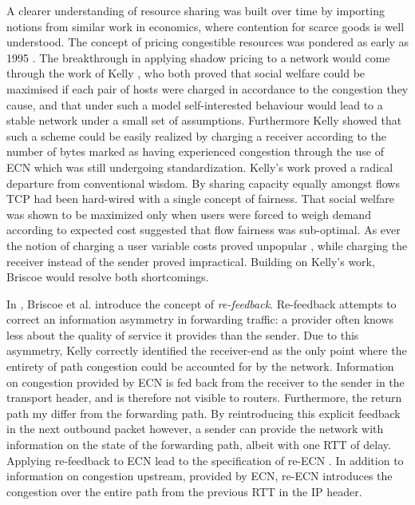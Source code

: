 A clearer understanding of resource sharing was built over time by importing notions from similar work in economics, where contention for scarce goods is well understood. 
The concept of pricing congestible resources was pondered as early as 1995 \cite{MacKieMason:1995p493}. 
The breakthrough in applying shadow pricing to a network would come through the work of Kelly \cite{Kelly:1998p139}, who both proved that social welfare could be maximised if each pair of hosts were charged in accordance to the congestion they cause, and that under such a model self-interested behaviour would lead to a stable network under a small set of assumptions.
Furthermore Kelly showed that such a scheme could be easily realized by charging a receiver according to the number of bytes marked as having experienced congestion through the use of \ac{ECN} which was still undergoing standardization.
Kelly's work proved a radical departure from conventional wisdom. 
By sharing capacity equally amongst flows \ac{TCP} had been hard-wired with a single concept of fairness.
That social welfare was shown to be maximized only when users were forced to weigh demand according to expected cost suggested that flow fairness was sub-optimal.
As ever the notion of charging a user variable costs proved unpopular \cite{Odlyzko:2004p290}, while charging the receiver instead of the sender proved impractical.
Building on Kelly's work, Briscoe would resolve both shortcomings.

In \cite{Briscoe:2005p346}, Briscoe et al. introduce the concept of \emph{re-feedback}.
Re-feedback attempts to correct an information asymmetry in forwarding traffic: a provider often knows less about the quality of service it provides than the sender.
Due to this asymmetry, Kelly correctly identified the receiver-end as the only point where the entirety of path congestion could be accounted for by the network.
Information on congestion provided by \ac{ECN} is fed back from the receiver to the sender in the transport header, and is therefore not visible to routers.
Furthermore, the return path my differ from the forwarding path.
By reintroducing this explicit feedback in the next outbound packet however, a sender can provide the network with information on the state of the forwarding path, albeit with one \ac{RTT} of delay.
Applying re-feedback to \ac{ECN} lead to the specification of re-\ac{ECN} \cite{Briscoe:2008p494}. 
In addition to information on congestion upstream, provided by \ac{ECN}, re-\ac{ECN} introduces the congestion over the entire path from the previous \ac{RTT} in the \ac{IP} header.

